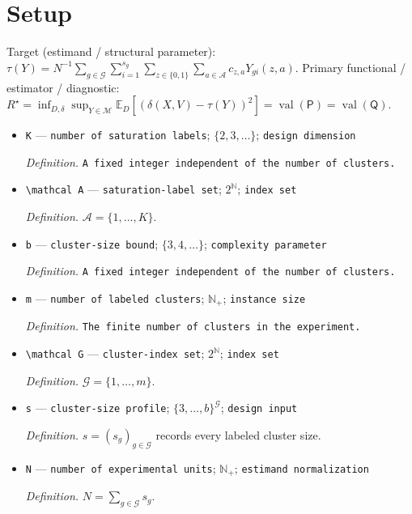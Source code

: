\documentclass{article}
\begin{document}
\section{Setup}

Target (estimand / structural parameter): \(\tau(Y)=N^{-1}\sum_{g\in\mathcal G}\sum_{i=1}^{s_g}\sum_{z\in\{0,1\}}\sum_{a\in\mathcal A}c_{z,a}Y_{g i}(z,a)\).
Primary functional / estimator / diagnostic: \(R^\star=\inf_{D,\delta}\sup_{Y\in\mathcal M}\mathbb E_D[(\delta(X,V)-\tau(Y))^2]=\operatorname{val}(\mathsf P)=\operatorname{val}(\mathsf Q)\).
\begin{itemize}
  \item \texttt{K} --- \texttt{number of saturation labels}; \(\{2,3,\ldots\}\); \texttt{design dimension}
  \par\smallskip\noindent\emph{Definition.} \texttt{A fixed integer independent of the number of clusters.}
  \item \texttt{\textbackslash{}\allowbreak{}mathcal A} --- \texttt{saturation-\allowbreak{}label set}; \(2^{\mathbb N}\); \texttt{index set}
  \par\smallskip\noindent\emph{Definition.} \(\mathcal A=\{1,\ldots,K\}\).
  \item \texttt{b} --- \texttt{cluster-\allowbreak{}size bound}; \(\{3,4,\ldots\}\); \texttt{complexity parameter}
  \par\smallskip\noindent\emph{Definition.} \texttt{A fixed integer independent of the number of clusters.}
  \item \texttt{m} --- \texttt{number of labeled clusters}; \(\mathbb N_{+}\); \texttt{instance size}
  \par\smallskip\noindent\emph{Definition.} \texttt{The finite number of clusters in the experiment.}
  \item \texttt{\textbackslash{}\allowbreak{}mathcal G} --- \texttt{cluster-\allowbreak{}index set}; \(2^{\mathbb N}\); \texttt{index set}
  \par\smallskip\noindent\emph{Definition.} \(\mathcal G=\{1,\ldots,m\}\).
  \item \texttt{s} --- \texttt{cluster-\allowbreak{}size profile}; \(\{3,\ldots,b\}^{\mathcal G}\); \texttt{design input}
  \par\smallskip\noindent\emph{Definition.} \(s=(s_g)_{g\in\mathcal G}\) records every labeled cluster size.
  \item \texttt{N} --- \texttt{number of experimental units}; \(\mathbb N_{+}\); \texttt{estimand normalization}
  \par\smallskip\noindent\emph{Definition.} \(N=\sum_{g\in\mathcal G}s_g\).

\end{itemize}
\end{document}
